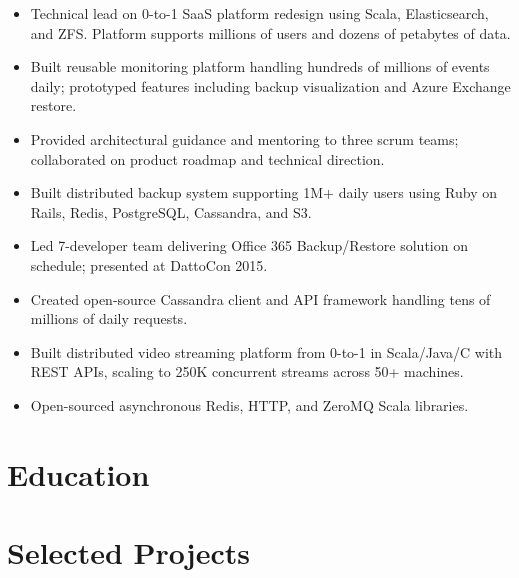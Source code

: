 \documentclass[11pt,a4paper,sans]{moderncv}
\begin{document}
{ \begin{itemize} \itemsep -2pt
  \item Technical lead on 0-to-1 SaaS platform redesign using Scala, Elasticsearch, and ZFS. Platform supports millions of users and dozens of petabytes of data.
  \item Built reusable monitoring platform handling hundreds of millions of events daily; prototyped features including backup visualization and Azure Exchange restore.
  \item Provided architectural guidance and mentoring to three scrum teams; collaborated on product roadmap and technical direction.
 \end{itemize} }

{ \begin{itemize} \itemsep -2pt
  \item Built distributed backup system supporting 1M+ daily users using Ruby on Rails, Redis, PostgreSQL, Cassandra, and S3.
  \item Led 7-developer team delivering Office 365 Backup/Restore solution on schedule; presented at DattoCon 2015.
  \item Created open-source Cassandra client and API framework handling tens of millions of daily requests.
\end{itemize} }

{ \begin{itemize} \itemsep -2pt
  \item Built distributed video streaming platform from 0-to-1 in Scala/Java/C with REST APIs, scaling to 250K concurrent streams across 50+ machines.
  \item Open-sourced asynchronous Redis, HTTP, and ZeroMQ Scala libraries.
\end{itemize} }


\section{\textbf{Education}}

\section{\textbf{Selected Projects}}
\end{document}
